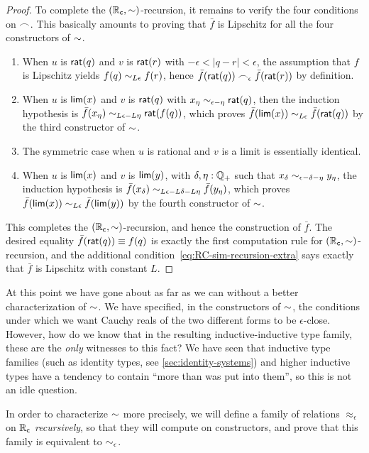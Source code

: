 \begin{proof}
  To complete the $(\mathbb{R}_\mathsf{c},\mathord\sim)$-recursion, it remains to verify the four conditions on $\frown$.
  This basically amounts to proving that $\bar f$ is Lipschitz for all the four constructors of $\mathord\sim$.
  \begin{enumerate}
  \item When $u$ is $\mathsf{rat}(q)$ and $v$ is $\mathsf{rat}(r)$ with $-\epsilon < |q-r| <\epsilon$, the assumption that $f$ is Lipschitz yields $f(q) \sim_{L\epsilon} f(r)$, hence $\bar{f}(\mathsf{rat}(q)) \frown_\epsilon \bar{f}(\mathsf{rat}(r))$ by definition.
  \item When $u$ is $\mathsf{lim}(x)$ and $v$ is $\mathsf{rat}(q)$ with $x_\eta \sim_{\epsilon - \eta} \mathsf{rat}(q)$, then the
      induction hypothesis is $\bar{f}(x_\eta) \sim_{L \epsilon - L \eta} \mathsf{rat}(f(q))$, which proves $\bar{f}(\mathsf{lim}(x)) \sim_{L \epsilon}
      \bar{f}(\mathsf{rat}(q))$ by the third constructor of $\mathord\sim$.
  \item The symmetric case when $u$ is rational and $v$ is a limit is essentially identical.
  \item When $u$ is $\mathsf{lim}(x)$ and $v$ is $\mathsf{lim}(y)$, with $\delta, \eta : \mathbb{Q}_{+}$ such that $x_\delta \sim_{\epsilon - \delta - \eta} y_\eta$,
      the induction hypothesis is $\bar{f}(x_\delta) \sim_{L \epsilon - L \delta - L \eta} \bar{f}(y_\eta)$, which proves $\bar{f}(\mathsf{lim}(x)) \sim_{L
        \epsilon} \bar{f}(\mathsf{lim}(y))$ by the fourth constructor of $\mathord\sim$.
  \end{enumerate}
  This completes the $(\mathbb{R}_\mathsf{c},\mathord\sim)$-recursion, and hence the construction of $\bar f$.
  The desired equality $\bar f(\mathsf{rat}(q))\equiv f(q)$ is exactly the first computation rule for $(\mathbb{R}_\mathsf{c},\mathord\sim)$-recursion, and the additional condition~\eqref{eq:RC-sim-recursion-extra} says exactly that $\bar f$ is Lipschitz with constant $L$.
\end{proof}

At this point we have gone about as far as we can without a better characterization of $\mathord\sim$.
We have specified, in the constructors of $\mathord\sim$, the conditions under which we want Cauchy reals of the two different forms to be $\epsilon$-close.
However, how do we know that in the resulting inductive-inductive type family, these are the \emph{only} witnesses to this fact?
We have seen that inductive type families (such as identity types, see \autoref{sec:identity-systems}) and higher inductive types have a tendency to contain ``more than was put into them'', so this is not an idle question.

In order to characterize $\mathord\sim$ more precisely, we will define a family of relations $\approx_\epsilon$ on $\mathbb{R}_\mathsf{c}$ \emph{recursively}, so that they will compute on constructors, and prove that this family is equivalent to $\sim_{\epsilon}$.

